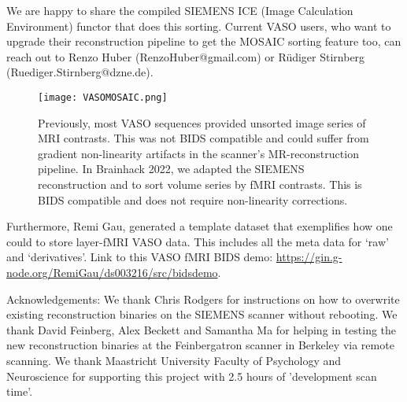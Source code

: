 \documentclass[../main.tex]{subfiles}
\begin{document}
We are happy to share the compiled SIEMENS ICE (Image Calculation Environment) functor that does this sorting. Current VASO users, who want to upgrade their reconstruction pipeline to get the MOSAIC sorting feature too, can reach out to Renzo Huber (RenzoHuber@gmail.com) or R\"udiger Stirnberg (Ruediger.Stirnberg@dzne.de).

\begin{figure}
	\centering
	\texttt{[image: VASOMOSAIC.png]}
	\caption{Previously, most VASO sequences provided unsorted image series of MRI contrasts. This was not BIDS compatible and could suffer from gradient non-linearity artifacts in the scanner’s MR-reconstruction pipeline. In Brainhack 2022, we adapted the SIEMENS reconstruction and to sort volume series by fMRI contrasts. This is BIDS compatible and does not require non-linearity corrections.
}
	\label{fig:VASOMOSAIC}
\end{figure}

Furthermore, Remi Gau, generated a template dataset that exemplifies how one could to store layer-fMRI VASO data. This includes all the meta data for ‘raw’ and ‘derivatives’. Link to this VASO fMRI BIDS demo: \href{https://gin.g-node.org/RemiGau/ds003216/src/bids_demo}{https://gin.g-node.org/RemiGau/ds003216/src/bids\textunderscore demo}.

Acknowledgements: We thank Chris Rodgers for instructions on how to overwrite existing reconstruction binaries on the SIEMENS scanner without rebooting. We thank David Feinberg, Alex Beckett and Samantha Ma for helping in testing the new reconstruction binaries at the Feinbergatron scanner in Berkeley via remote scanning. We thank Maastricht University Faculty of Psychology and Neuroscience for supporting this project with 2.5 hours of 'development scan time'.
\end{document}
